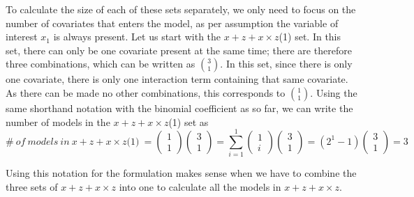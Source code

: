 To calculate the size of each of these sets separately, we only need to focus on the number of covariates that enters the model, as per assumption the variable of interest $x_1$ is always present. Let us start with the $x + z + x \times z$(1) set. In this set, there can only be one covariate present at the same time; there are therefore three combinations, which can be written as $\binom{3}{1}$. In this set, since there is only one covariate, there is only one interaction term containing that same covariate. As there can be made no other combinations, this corresponds to $\binom{1}{1}$. Using the same shorthand notation with the binomial coefficient as so far, we can write the number of models in the $x + z + x \times z$(1) set as
\[\#\ of\ models\ in\ x + z + x \times z\textit{(1)}\ =\left( \begin{array}{c}
1 \\ 
1 \end{array}
\right)\left( \begin{array}{c}
3 \\ 
1 \end{array}
\right)=\sum^1_{i=1}{\left( \begin{array}{c}
1 \\ 
i \end{array}
\right)}\left( \begin{array}{c}
3 \\ 
1 \end{array}
\right)=\left(2^1-1\right)\left( \begin{array}{c}
3 \\ 
1 \end{array}
\right)=3\] 

Using this notation for the formulation makes sense when we have to combine the three sets of $x + z + x \times z$ into one to calculate all the models in $x + z + x \times z$.

